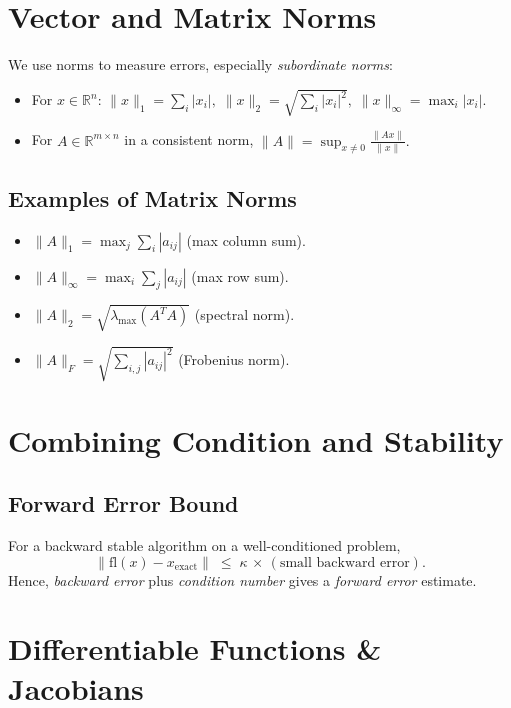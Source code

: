 \section{Vector and Matrix Norms}

We use norms to measure errors, especially \emph{subordinate norms}:
\begin{itemize}
    \item For \(x \in \mathbb{R}^n\):
      \(\|x\|_1 = \sum_i |x_i|,\; 
        \|x\|_2 = \sqrt{\sum_i |x_i|^2},\; 
        \|x\|_\infty = \max_i |x_i|\).
    \item For \(A \in \mathbb{R}^{m \times n}\) in a consistent norm,
      \(\|A\| = \sup_{x \neq 0} \frac{\|Ax\|}{\|x\|}.\)
\end{itemize}

\subsection{Examples of Matrix Norms}
\begin{itemize}
    \item \(\|A\|_1 = \max_{j} \sum_i |a_{ij}|\) (max column sum).
    \item \(\|A\|_\infty = \max_{i} \sum_j |a_{ij}|\) (max row sum).
    \item \(\|A\|_2 = \sqrt{\lambda_{\max}(A^T A)}\) (spectral norm).
    \item \(\|A\|_F = \sqrt{\sum_{i,j} |a_{ij}|^2}\) (Frobenius norm).
\end{itemize}

\section{Combining Condition and Stability}

\subsection{Forward Error Bound}

For a backward stable algorithm on a well-conditioned problem,
\[
\|\mathrm{fl}(x) - x_{\mathrm{exact}}\| 
\;\le\; \kappa \,\times\, (\text{small backward error}).
\]
Hence, \emph{backward error} plus \emph{condition number} gives a \emph{forward error} estimate.

\section{Differentiable Functions \& Jacobians}

